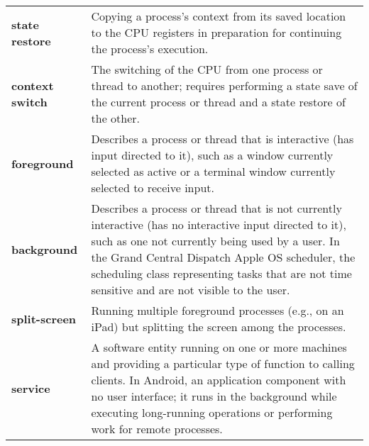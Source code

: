 \begin{tabular}{>{\raggedright}p{} >{\raggedright\arraybackslash}p{}}
\textbf{state restore} & Copying a process's context from its saved location to the CPU registers in preparation for continuing the process's execution. \\
\textbf{context switch} & The switching of the CPU from one process or thread to another; requires performing a state save of the current process or thread and a state restore of the other. \\
\textbf{foreground} & Describes a process or thread that is interactive (has input directed to it), such as a window currently selected as active or a terminal window currently selected to receive input. \\
\textbf{background} & Describes a process or thread that is not currently interactive (has no interactive input directed to it), such as one not currently being used by a user. In the Grand Central Dispatch Apple OS scheduler, the scheduling class representing tasks that are not time sensitive and are not visible to the user. \\
\textbf{split-screen} & Running multiple foreground processes (e.g., on an iPad) but splitting the screen among the processes. \\
\textbf{service} & A software entity running on one or more machines and providing a particular type of function to calling clients. In Android, an application component with no user interface; it runs in the background while executing long-running operations or performing work for remote processes. \\
\bottomrule
\end{tabular}
\vspace{\baselineskip}
